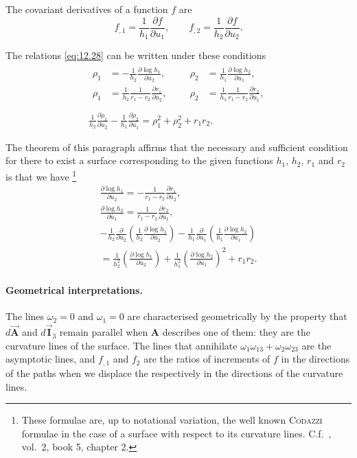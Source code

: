 \documentclass[leqno,11pt]{book}
\numberwithin{equation}{chapter}
\newcommand{\pd}{\partial}
\theoremstyle{shape1}
\theoremstyle{shapesmall}
\newcommand{\rvec}[1]{\vec{\mathbf{#1}}}
\newcommand{\ivec}{\rvec{I}}
\begin{document}
The covariant derivatives of a function $f$ are
\[
f_{,1}=\frac{1}{h_{1}}\frac{\pd f}{\pd u_{1}},\qquad f_{,2}=\frac{1}{h_{2}}\frac{\pd f}{\pd u_{2}}.
\]

The relations \eqref{eq:12.28} can be written under these conditions
\begin{gather*}
  \begin{aligned}
    \rho_{1}&=-\frac{1}{h_{2}}\frac{\pd\log h_{1}}{\pd u_{2}},&&&\rho_{2}&=\frac{1}{h_{1}}\frac{\pd \log h_{2}}{\pd u_{1}},\\
    \rho_{1}&=\frac{1}{h_{2}}\frac{1}{r_{1}-r_{2}}\frac{\pd r_{1}}{\pd u_{2}},&&&\rho_{2}&=\frac{1}{h_{1}}\frac{1}{r_{1}-r_{2}}\frac{\pd r_{2}}{\pd u_{1}},\\
  \end{aligned}\\
  \frac{1}{h_{2}}\frac{\pd \rho_{1}}{\pd u_{2}}-\frac{1}{h_{1}}\frac{\pd \rho_{2}}{\pd u_{1}}=\rho_{1}^{2}+\rho_{2}^{2}+r_{1}r_{2}.
\end{gather*}

The theorem of this paragraph affirms that the necessary and sufficient condition for there to exist a surface corresponding to the given functions $h_{1}$, $h_{2}$, $r_{1}$ and $r_{2}$ is that we have \footnote{These formulae are, up to notational variation, the well known \textsc{Codazzi} formulae in the case of a surface with respect to its curvature lines. C.f.~\cite{1}, vol.~2, book 5, chapter 2.}
\begin{gather*}
  \frac{\pd\log h_{1}}{\pd u_{2}}=-\frac{1}{r_{1}-r_{2}}\frac{\pd r_{1}}{\pd u_{2}},\\
  \frac{\pd\log h_{2}}{\pd u_{1}}=\frac{1}{r_{1}-r_{2}}\frac{\pd r_{2}}{\pd u_{1}},\\
  -\frac{1}{h_{2}}
  \frac{\pd}{\pd u_{2}}\left(\frac{1}{h_{2}}\frac{\pd\log h_{1}}{\pd u_{2}}\right)-\frac{1}{h_{1}}\frac{\pd}{\pd u_{1}}\left(\frac{1}{h_{1}}\frac{\pd\log h_{2}}{\pd u_{1}}\right)
\\    =\frac{1}{h_{2}^{2}}\left(\frac{\pd \log h_{1}}{\pd u_{2}}\right)+\frac{1}{h_{1}^{2}}\left(\frac{\pd\log h_{2}}{\pd u_{1}}\right)^{2}+r_{1}r_{2}.
\end{gather*}

\paragraph{Geometrical interpretations.}
\label{sec:191}
The lines $\omega_{2}=0$ and $\omega_{1}=0$ are characterised geometrically by the property that $d\vec{\mathbf{A}}$ and $d\ivec_{3}$ remain parallel  when $\mathbf{A}$ describes one of them: they are the curvature lines of the surface. The lines that annihilate $\omega_{1}\omega_{13}+\omega_{2}\omega_{23}$ are the asymptotic lines, and $f_{,1}$ and $f_{2}$ are the ratios of increments of $f$ in the directions of the paths when we displace the respectively in the directions of the curvature lines.
\end{document}

